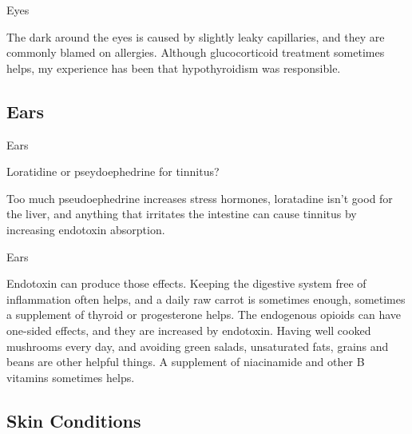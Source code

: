\documentclass[11pt,oneside,openany,extrafontsizes]{memoir}
\begin{document}
\begin{standalonequote}{Eyes}

    \begin{answer}
      The dark around the eyes is caused by slightly leaky capillaries, and they are commonly blamed on allergies. Although glucocorticoid treatment sometimes helps, my experience has been that hypothyroidism was responsible.
    \end{answer}
\end{standalonequote}

\subsection{Ears}

\begin{qaexchange}{Ears}

    \begin{question}
        Loratidine or pseydoephedrine for tinnitus?
    \end{question}

    \begin{answer}
        Too much pseudoephedrine increases stress hormones, loratadine isn't good for the liver, and anything that irritates the intestine can cause tinnitus by increasing endotoxin absorption.
    \end{answer}
\end{qaexchange}

\begin{standalonequote}{Ears}

    \begin{answer}
        Endotoxin can produce those effects. Keeping the digestive system free of inflammation often helps, and a daily raw carrot is sometimes enough, sometimes a supplement of thyroid or progesterone helps. The endogenous opioids can have one-sided effects, and they are increased by endotoxin. Having well cooked mushrooms every day, and avoiding green salads, unsaturated fats, grains and beans are other helpful things. A supplement of niacinamide and other B vitamins sometimes helps.
    \end{answer}
\end{standalonequote}

\subsection{Skin Conditions}
\end{document}
